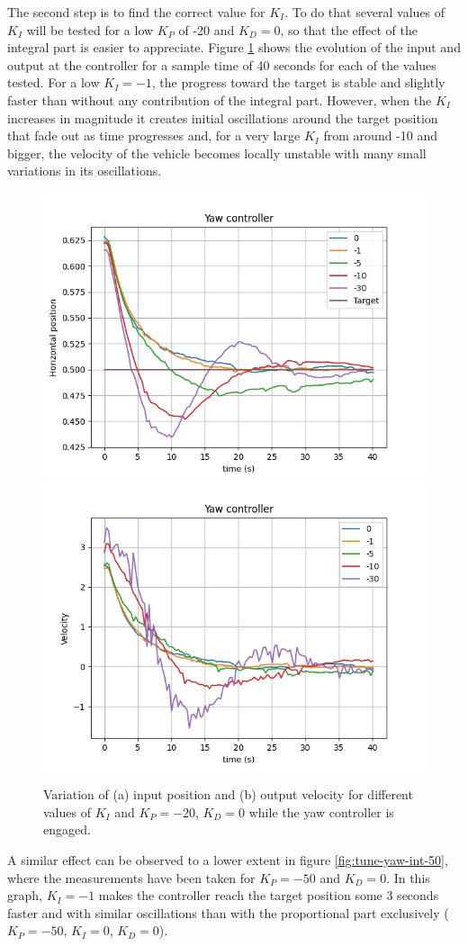 The second step is to find the correct value for $K_I$. To do that several values of $K_I$ will be tested for a low $K_P$ of -20 and $K_D=0$, so that the effect of the integral part is easier to appreciate. Figure \ref{fig:tune-yaw-int-20} shows the evolution of the input and output at the controller for a sample time of 40 seconds for each of the values tested. 
For a low $K_I=-1$, the progress toward the target is stable and slightly faster than without any contribution of the integral part.
However, when the $K_I$ increases in magnitude it creates initial oscillations around the target position that fade out as time progresses and, for a very large $K_I$ from around -10 and bigger, the velocity of the vehicle becomes locally unstable with many small variations in its oscillations.

\begin{figure}
  \centering
  \includegraphics[width=.45\linewidth]{img/pid/yaw/yaw_pos_p20_int_d0.png}
  \includegraphics[width=.45\linewidth]{img/pid/yaw/yaw_vel_p20_int_d0.png}
  \caption{Variation of (a) input position and (b) output velocity for different values of $K_{I}$ and $K_P=-20$, $K_D=0$ while the yaw controller is engaged.}\label{fig:tune-yaw-int-20}
\end{figure}

A similar effect can be observed to a lower extent in figure \ref{fig:tune-yaw-int-50}, where the measurements have been taken for $K_P=-50$ and $K_D=0$. 
In this graph, $K_I=-1$ makes the controller reach the target position some 3 seconds faster and with similar oscillations than with the proportional part exclusively ($K_P=-50$, $K_I=0$, $K_D=0$).

